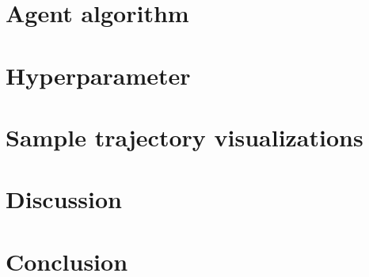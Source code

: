 \documentclass{article}
\begin{document}
\section{Agent algorithm}

\section{Hyperparameter}

\section{Sample trajectory visualizations}

\section{Discussion}

\section{Conclusion}
\end{document}
